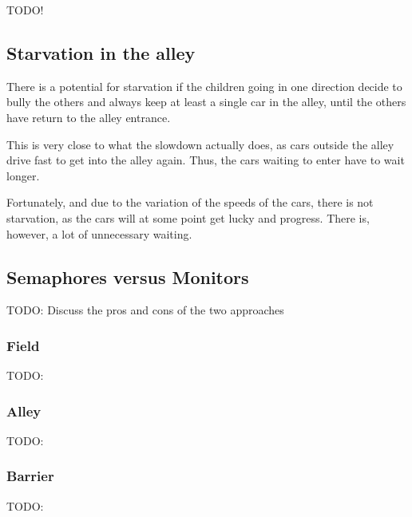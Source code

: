 
TODO!

\subsection{Starvation in the alley}
There is a potential for starvation if the children going in one direction decide to bully the others and always keep at least a single car in the alley, until the others have return to the alley entrance.

This is very close to what the slowdown actually does, as cars outside the alley drive fast to get into the alley again. Thus, the cars waiting to enter have to wait longer.

Fortunately, and due to the variation of the speeds of the cars, there is not starvation, as the cars will at some point get lucky and progress. There is, however, a lot of unnecessary waiting.

\subsection{Semaphores versus Monitors}
\label{sub:disc-sema-moni}

TODO: Discuss the pros and cons of the two approaches

\subsubsection{Field}
\label{subsub:disc-field}
TODO:

\subsubsection{Alley}
\label{subsub:disc-alley}
TODO:

\subsubsection{Barrier}
\label{subsub:disc-barrier}
TODO: